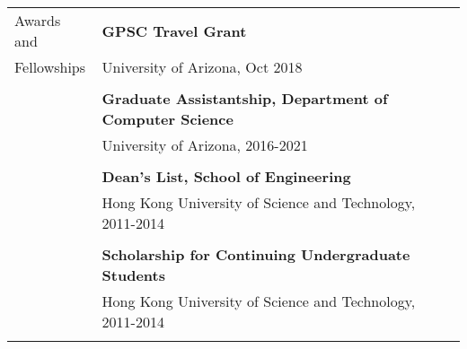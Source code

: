 \documentclass[letterpaper,11pt,oneside]{article}
\begin{document}
\noindent \begin{tabular}{@{} l l}
\Large{Awards and}
    & \textbf{GPSC Travel Grant} \\
\Large{Fellowships} 
    & University of Arizona, Oct 2018 \\
    & \\
    & \textbf{Graduate Assistantship, Department of Computer Science} \\
    & University of Arizona, 2016-2021 \\
    & \\
    & \textbf{Dean’s List, School of Engineering} \\
    & Hong Kong University of Science and Technology, 2011-2014 \\
    & \\
    & \textbf{Scholarship for Continuing Undergraduate Students} \\
    & Hong Kong University of Science and Technology, 2011-2014 \\
    & \\
\end{tabular}
\end{document}

